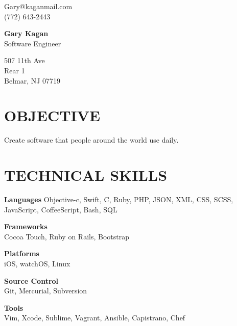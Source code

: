 \documentclass{res}
\begin{document}
 
\begin{multicols}{3}
\begin{flushleft}
Gary@kaganmail.com\\[0.3em]
(772) 643-2443
\end{flushleft}
\columnbreak
\begin{center}
{\huge\textbf{Gary Kagan}}\\
Software Engineer
\end{center}
\columnbreak
\begin{flushright}
507 11th Ave\\
Rear 1\\
Belmar, NJ 07719
\end{flushright}
\end{multicols}


\begin{resume}
\section{OBJECTIVE}          
    Create software that people around the world use daily.

\section{TECHNICAL SKILLS}
    \textbf{Languages}
    Objective-c, Swift, C, Ruby, PHP, JSON, XML, CSS, SCSS, JavaScript, CoffeeScript, Bash, SQL

    \begin{multicols}{2}
    \begin{flushleft}
    \textbf{Frameworks}\\
    Cocoa Touch, Ruby on Rails, Bootstrap
    \end{flushleft}
    \columnbreak
    \textbf{Platforms}\\
    iOS, watchOS, Linux
    \end{multicols}

    \begin{multicols}{2}
    \begin{flushleft}
    \textbf{Source Control}\\
    Git, Mercurial, Subversion
    \end{flushleft}
    \columnbreak
    \textbf{Tools}\\
    Vim, Xcode, Sublime, Vagrant, Ansible, Capistrano, Chef
    \end{multicols}



\end{resume}
\end{document}
